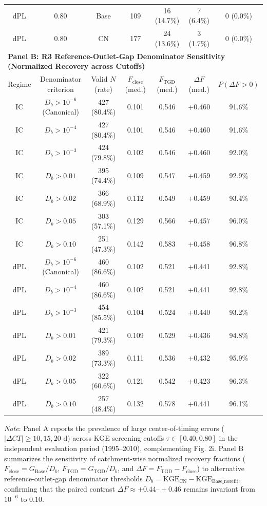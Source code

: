 \begin{table}[t]
\begin{threeparttable}
\begin{tabular}{ccccccc}
dPL & 0.80 & Base & 109 & 16 (14.7\%) & 7 (6.4\%) & 0 (0.0\%) \\
dPL & 0.80 & CN & 177 & 24 (13.6\%) & 3 (1.7\%) & 0 (0.0\%) \\
\midrule
\multicolumn{7}{l}{\textbf{Panel B: R3 Reference-Outlet-Gap Denominator Sensitivity (Normalized Recovery across Cutoffs)}} \\
\midrule
Regime & Denominator criterion & Valid $N$ (rate) & $F_{\mathrm{close}}$ (med.) & $F_{\mathrm{TGD}}$ (med.) & $\Delta F$ (med.) & $P(\Delta F > 0)$ \\
\midrule
IC & $D_b > 10^{-6}$ (Canonical) & 427 (80.4\%) & 0.101 & 0.546 & +0.460 & 91.6\% \\
IC & $D_b > 10^{-4}$ & 427 (80.4\%) & 0.101 & 0.546 & +0.460 & 91.6\% \\
IC & $D_b > 10^{-3}$ & 424 (79.8\%) & 0.102 & 0.546 & +0.460 & 92.0\% \\
IC & $D_b > 0.01$ & 395 (74.4\%) & 0.109 & 0.547 & +0.459 & 92.9\% \\
IC & $D_b > 0.02$ & 366 (68.9\%) & 0.112 & 0.549 & +0.459 & 93.4\% \\
IC & $D_b > 0.05$ & 303 (57.1\%) & 0.129 & 0.566 & +0.457 & 96.0\% \\
IC & $D_b > 0.10$ & 251 (47.3\%) & 0.142 & 0.583 & +0.458 & 96.8\% \\
dPL & $D_b > 10^{-6}$ (Canonical) & 460 (86.6\%) & 0.102 & 0.521 & +0.441 & 92.8\% \\
dPL & $D_b > 10^{-4}$ & 460 (86.6\%) & 0.102 & 0.521 & +0.441 & 92.8\% \\
dPL & $D_b > 10^{-3}$ & 454 (85.5\%) & 0.104 & 0.524 & +0.440 & 93.2\% \\
dPL & $D_b > 0.01$ & 421 (79.3\%) & 0.109 & 0.529 & +0.436 & 94.8\% \\
dPL & $D_b > 0.02$ & 389 (73.3\%) & 0.111 & 0.536 & +0.432 & 95.9\% \\
dPL & $D_b > 0.05$ & 322 (60.6\%) & 0.121 & 0.542 & +0.423 & 96.3\% \\
dPL & $D_b > 0.10$ & 257 (48.4\%) & 0.132 & 0.578 & +0.441 & 96.1\% \\
\bottomrule
\end{tabular}
\begin{tablenotes}[flushleft]
\footnotesize
\item \textit{Note}: Panel A reports the prevalence of large center-of-timing errors ($|\Delta CT| \ge 10, 15, 20\text{ d}$) across KGE screening cutoffs $\tau \in [0.40, 0.80]$ in the independent evaluation period (1995--2010), complementing Fig. 2i. Panel B summarizes the sensitivity of catchment-wise normalized recovery fractions ($F_{\mathrm{close}} = G_{\mathrm{Base}} / D_b$, $F_{\mathrm{TGD}} = G_{\mathrm{TGD}} / D_b$, and $\Delta F = F_{\mathrm{TGD}} - F_{\mathrm{close}}$) to alternative reference-outlet-gap denominator thresholds $D_b = \mathrm{KGE}_{\mathrm{CN}} - \mathrm{KGE}_{\mathrm{Base\_norefit}}$, confirming that the paired contrast $\Delta F \approx +0.44\text{--}+0.46$ remains invariant from $10^{-6}$ to $0.10$.
\end{tablenotes}
\end{threeparttable}
\end{table}
